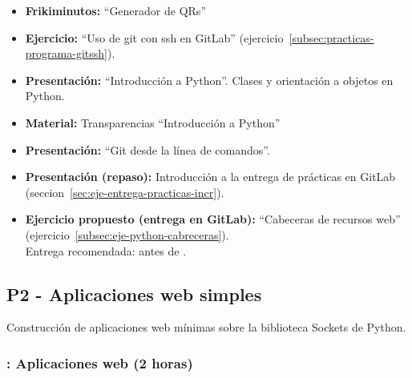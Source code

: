 \documentclass[a4paper,12pt]{article}
\begin{document}
\begin{itemize}
  \item \textbf{Frikiminutos:} ``Generador de QRs''
  \item \textbf{Ejercicio:} ``Uso de git con ssh en GitLab'' (ejercicio~\ref{subsec:practicas-programa-gitssh}).

  \item \textbf{Presentación:} ``Introducción a Python''. Clases y orientación a objetos en Python.
  \item \textbf{Material:} Transparencias ``Introducción a Python''
  \item \textbf{Presentación:} ``Git desde la línea de comandos''.
  \item \textbf{Presentación (repaso):} Introducción a la entrega de prácticas en GitLab (seccion~\ref{sec:eje-entrega-practicas-incr}).
  \item \textbf{Ejercicio propuesto (entrega en GitLab):} ``Cabeceras de recursos web'' (ejercicio~\ref{subsec:eje-python-cabreceras}). \\
  Entrega recomendada: antes de \martesD.

\end{itemize}

\subsection{P2 - Aplicaciones web simples}


Construcción de aplicaciones web mínimas sobre la biblioteca Sockets de Python.


\subsubsection{\martesD: Aplicaciones web (2 horas)}
\label{cal:martesD}
\end{document}
